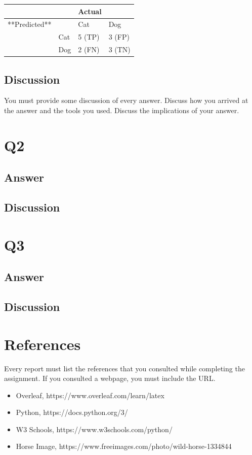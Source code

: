 \documentclass{article}
\begin{document}
\begin{table}[!ht]
    \centering
    \begin{tabular}{|l|l|l|l|}
    \hline
        ~ & ~ & Actual & ~ \\ \hline
        **Predicted** & ~ & Cat & Dog \\ \hline
        ~ & Cat & 5 (TP) & 3 (FP) \\ \hline
        ~ & Dog & 2 (FN) & 3 (TN) \\ \hline
    \end{tabular}
\end{table}
	\subsection*{Discussion}
 You must provide some discussion of every answer. Discuss how you arrived at the answer and the tools you used. Discuss the implications of your answer.

    \section*{Q2}
        \subsection*{Answer}
        \subsection*{Discussion}
    \section*{Q3}
        \subsection*{Answer}
        \subsection*{Discussion}
    \section*{References}
    Every report must list the references that you consulted while completing the assignment. If you consulted a webpage, you must include the URL.
    \begin{itemize}
        \item Overleaf, https://www.overleaf.com/learn/latex
        \item Python, https://docs.python.org/3/
        \item W3 Schools, https://www.w3schools.com/python/
        \item Horse Image, https://www.freeimages.com/photo/wild-horse-1334844
    \end{itemize}
\end{document}
